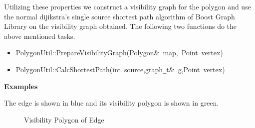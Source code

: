 Utilizing these properties we construct a visibility graph for the polygon and use the normal dijikstra's single source shortest path
algorithm of Boost Graph Library \cite{BOOST} on the visibility graph obtained. The following two functions do the above mentioned tasks.



\begin{itemize}


\item

{
\noindent \ttfamily
\noindent \ttfamily
\noindent \ttfamily
\noindent \ttfamily
\jttstylek PolygonUtil::PrepareVisibilityGraph\jttstylei (\jttstylek Polygon\&~map,~Point~vertex\jttstylei [])\\

}


\item

{
\noindent \ttfamily
\jttstylek PolygonUtil::CalcShortestPath\jttstylei (\jttstylej int~\jttstylek source,graph\verb#_#t\&~g,Point~vertex\jttstylei [])\\
\noindent \ttfamily
}

\end{itemize}

{\bf Examples}

The edge is shown in blue and its visibility polygon is shown in green.

\begin{figure}[h]
\begin{center}
\caption{\label{fig:Visibility Polygon of Edge}Visibility Polygon of Edge}
\end{center}
\end{figure}

